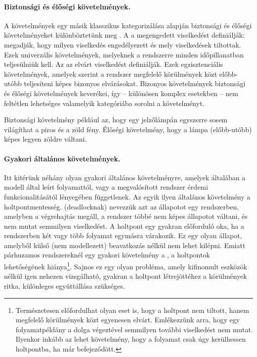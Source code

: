 \paragraph{Biztonsági és élőségi követelmények.}
A követelmények egy másik klasszikus kategorizálása alapján biztonsági és élőségi követelményeket különböztetünk meg \cite{Lamport:1977}.
A  a megengedett viselkedést definiálják: megadják, hogy milyen viselkedés engedélyezett és mely viselkedések tiltottak. Ezek univerzális követelmények, melyeknek a rendszerre minden időpillanatban teljesülniük kell.
Az  az elvárt viselkedést definiálják.
Ezek egzisztenciális követelmények, amelyek szerint a rendszer megfelelő körülmények közt előbb-utóbb teljesíteni képes bizonyos elvárásokat.
Bizonyos követelmények biztonsági és élőségi követelmények keverékei, így -- különösen komplex esetekben -- nem feltétlen lehetséges valamelyik kategóriába sorolni a követelményt.

\begin{megjegyzes}
Biztonsági követelmény például az, hogy egy jelzőlámpán egyszerre sosem világíthat a piros és a zöld fény. Élőségi követelmény, hogy a lámpa (előbb-utóbb) képes legyen zöldre váltani.
\end{megjegyzes}


\paragraph{Gyakori általános követelmények.}
Itt kitérünk néhány olyan gyakori általános követelményre, amelyek általában a modell által leírt folyamattól, vagy a megvalósított rendszer érdemi funkcionalitásától lényegében függetlenek.
Az egyik ilyen általános követelmény a holtpontmentesség.  (deadlocknak) nevezzük azt az állapotot egy rendszerben, amelyben a végrehajtás megáll, a rendszer többé nem képes állapotot váltani, és nem mutat semmilyen viselkedést. A holtpont egy gyakran előforduló oka, ha a rendszerben két vagy több folyamat egymásra várakozik. Ez egy olyan állapot, amelyből külső (nem modellezett) beavatkozás nélkül nem lehet kilépni. Emiatt párhuzamos rendszereknél egy gyakori követelmény a , a holtpontok lehetőségének hiánya\footnote{Természetesen előfordulhat olyan eset is, hogy a holtpont nem tiltott, hanem megfelelő körülmények közt egyenesen elvárt. Emlékezzünk arra, hogy egy folyamatpéldány a dolga végeztével semmilyen további viselkedést nem mutat. Ilyenkor inkább az lehet követelmény, hogy a folyamat csak úgy kerülhessen holtpontba, ha már befejeződött.}. Sajnos ez egy olyan probléma, amely kifinomult eszközök nélkül igen nehezen vizsgálható, gyakran a holtpont létrejöttéhez a körülmények ritka, különleges együttállása szükséges.

